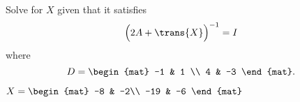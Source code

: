 
\begin{Exercise}[
name={},
title={}, 
difficulty=0,
origin={\cite{YL}}]
Solve for $X$ given that it satisfies
\[
\Big(2A+\trans{X}\Big)^{-1}=I
\]
where
\[
D=
\begin{mat}
-1 & 1 \\
4 & -3
\end{mat}.
\]

\end{Exercise}

\begin{Answer}
$
X=
\begin{mat}
-8 & -2\\
-19 & -6
\end{mat}
$
\end{Answer}
